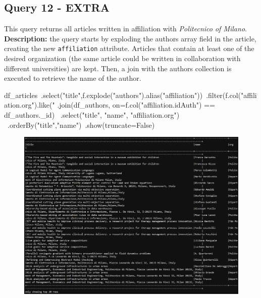\documentclass{Configuration_Files/PoliMi3i_thesis}
\begin{document}
\subsection{Query 12 - EXTRA}
This query returns all articles written in affiliation with \emph{Politecnico of Milano}.\newline
\textbf{Description:} the query starts by exploding the authors array field in the article, creating the new \verb|affiliation| attribute.
Articles that contain at least one of the desired organization (the same article could be written in collaboration with different
universities) are kept. Then, a join with the authors collection is executed to retrieve the name of the author.
\begin{python}
df_articles\
    .select("title",f.explode("authors").alias("affiliation"))\
    .filter(f.col("affiliation.org").like("%
    .join(df_authors, on=f.col("affiliation.idAuth") == df_authors._id) \
    .select("title", "name", "affiliation.org") \
    .orderBy("title","name")\
    .show(truncate=False)
\end{python}
\begin{figure}[H]
\centering
\includegraphics[width=1\textwidth]{query/spark_q12.PNG}
\label{fig:query12}
\end{figure}
\end{document}
